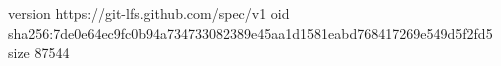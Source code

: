 version https://git-lfs.github.com/spec/v1
oid sha256:7de0e64ec9fc0b94a734733082389e45aa1d1581eabd768417269e549d5f2fd5
size 87544
